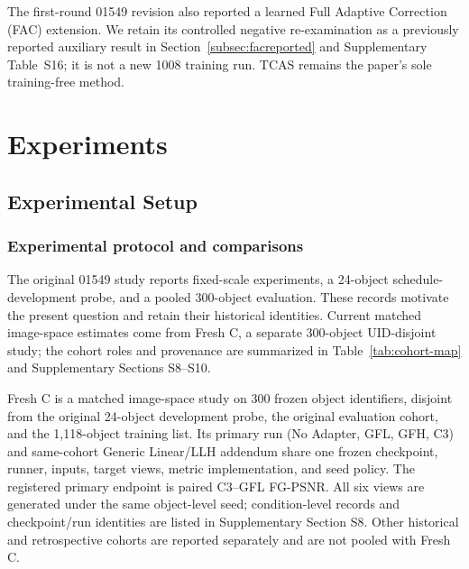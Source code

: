 \documentclass[times,twocolumn,final]{elsarticle}
\providecommand{\DIFadd}[1]{{\protect\color{blue} \sf #1}} %
\providecommand{\DIFaddbegin}{} %
\providecommand{\DIFaddend}{} %
\begin{document}
  \DIFaddbegin \DIFadd{The first-round 01549 revision also reported a learned }\DIFaddend Full Adaptive Correction (FAC)  
 \DIFaddbegin \DIFadd{extension. We retain its controlled negative re-examination as a previously reported auxiliary result in Section~\ref{subsec:facreported} and Supplementary Table~S16; it is not a new 1008 training run. TCAS remains the paper's sole training-free method}\DIFaddend .

\section{Experiments}
\label{sec:experiments}

\subsection{Experimental Setup}
\label{subsec:setup}

\subsubsection{Experimental protocol and comparisons}

  \DIFaddbegin \DIFadd{The original 01549 study reports fixed-scale experiments, a 24-object schedule-development probe, and a pooled 300-object evaluation. These records motivate the present question and retain their historical identities. Current matched image-space estimates come from Fresh C, a separate 300-object UID-disjoint study; the cohort roles and provenance are summarized in Table~\ref{tab:cohort-map} and Supplementary Sections S8--S10}\DIFaddend .

  \DIFaddbegin \DIFadd{Fresh C is a matched image-space study on 300 frozen object identifiers, disjoint from the original }\DIFaddend 24-object   \DIFaddbegin \DIFadd{development probe, the original evaluation cohort, and the 1,118-object training list. Its primary run (No Adapter, GFL, GFH, C3) and same-cohort Generic Linear/LLH addendum share one frozen checkpoint, runner, inputs, target views, metric implementation, and seed policy. The registered primary endpoint is paired C3--GFL FG-PSNR. All six views are generated under the same object-level seed; condition-level records and checkpoint/run identities are listed in Supplementary Section S8. Other historical and retrospective cohorts are reported separately and are not pooled with Fresh C.
}\DIFaddend 
\end{document}
